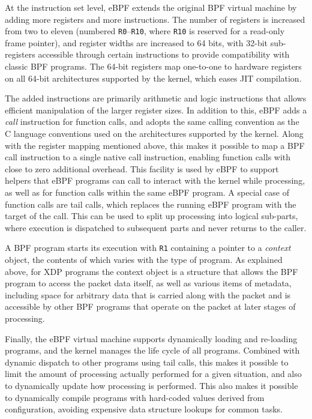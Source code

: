 \documentclass[10pt,sigconf,anonymous]{acmart}
\begin{document}
At the instruction set level, eBPF extends the original BPF virtual machine by
adding more registers and more instructions. The number of registers is
increased from two to eleven (numbered \texttt{R0}--\texttt{R10}, where
\texttt{R10} is reserved for a read-only frame pointer), and register widths are
increased to 64 bits, with 32-bit sub-registers accessible through certain
instructions to provide compatibility with classic BPF programs. The 64-bit
registers map one-to-one to hardware registers on all 64-bit architectures
supported by the kernel, which eases JIT compilation.

The added instructions are primarily arithmetic and logic instructions that
allows efficient manipulation of the larger register sizes. In addition to this,
eBPF adds a \emph{call} instruction for function calls, and adopts the same
calling convention as the C language conventions used on the architectures
supported by the kernel. Along with the register mapping mentioned above, this
makes it possible to map a BPF call instruction to a single native call
instruction, enabling function calls with close to zero additional overhead.
This facility is used by eBPF to support helpers that eBPF programs can call to
interact with the kernel while processing, as well as for function calls within
the same eBPF program. A special case of function calls are tail calls, which
replaces the running eBPF program with the target of the call. This can be used
to split up processing into logical sub-parts, where execution is dispatched to
subsequent parts and never returns to the caller.

A BPF program starts its execution with \texttt{R1} containing a pointer to a
\emph{context} object, the contents of which varies with the type of program. As
explained above, for XDP programs the context object is a structure that allows
the BPF program to access the packet data itself, as well as various items of
metadata, including space for arbitrary data that is carried along with the
packet and is accessible by other BPF programs that operate on the packet at
later stages of processing.

Finally, the eBPF virtual machine supports dynamically loading and re-loading
programs, and the kernel manages the life cycle of all programs. Combined with
dynamic dispatch to other programs using tail calls, this makes it possible to
limit the amount of processing actually performed for a given situation, and
also to dynamically update how processing is performed. This also makes it
possible to dynamically compile programs with hard-coded values derived from
configuration, avoiding expensive data structure lookups for common tasks.
\end{document}
